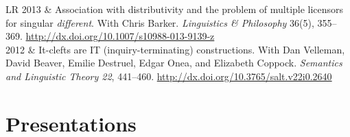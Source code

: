 \documentclass[12pt]{article}
\newcommand{\doi}[1]{\url{http://dx.doi.org/#1}}
\newcommand{\flag}{}
\begin{document}
\begin{longtable}{LR}
  \flag%
  2013  & Association with distributivity and the problem of multiple
          licensors for singular \textit{different}.\newline
          With Chris Barker.\newline
          \textit{Linguistics \& Philosophy} 36(5), 355--369.\newline
          \doi{10.1007/s10988-013-9139-z}\\ %
  2012  & It-clefts are IT (inquiry-terminating) constructions.\newline
          With Dan Velleman, David Beaver, Emilie Destruel, Edgar Onea, and
          Elizabeth Coppock.\newline
          \textit{Semantics and Linguistic Theory 22}, 441--460.\newline
          \doi{10.3765/salt.v22i0.2640}
\end{longtable}
\endgroup

\medskip

\section*{Presentations}
\end{document}
